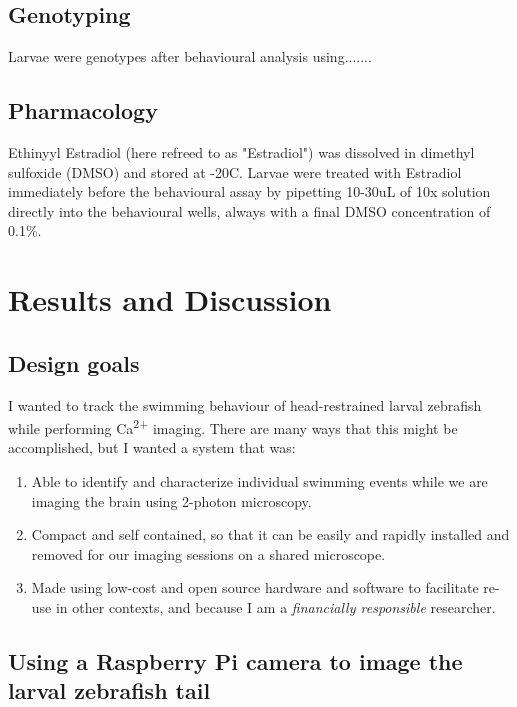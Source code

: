 \documentclass[9pt,lineno]{RandlettLab_elife}
\begin{document}
\subsection{Genotyping}

Larvae were genotypes after behavioural analysis using.......

\subsection{Pharmacology}

Ethinyyl Estradiol (here refreed to as "Estradiol") was dissolved in dimethyl sulfoxide (DMSO) and stored at -20\degree C. Larvae were treated with Estradiol immediately before the behavioural assay by pipetting 10-30uL of 10x solution directly into the behavioural wells, always with a final DMSO concentration of 0.1\%.

\section{Results and Discussion}

\subsection{Design goals}\textmu

I wanted to track the swimming behaviour of head-restrained larval zebrafish while performing Ca\textsuperscript{2+} imaging. There are many ways that this might be accomplished, but I wanted a system that was: 
\begin{enumerate}
    \item Able to identify and characterize individual swimming events while we are imaging the brain using 2-photon microscopy.
    \item Compact and self contained, so that it can be easily and rapidly installed and removed for our imaging sessions on a shared microscope.
    \item Made using low-cost and open source hardware and software to facilitate re-use in other contexts, and because I am a  \emph{financially responsible} researcher.

\end{enumerate}

\subsection{Using a Raspberry Pi camera to image the larval zebrafish tail}
\end{document}
